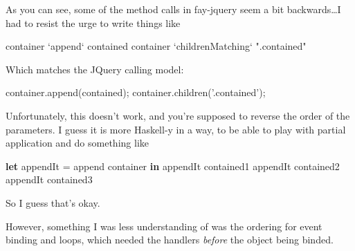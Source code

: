 \documentclass[]{article}
\newenvironment{Shaded}{}{}
\newcommand{\KeywordTok}[1]{\textcolor[rgb]{0.00,0.44,0.13}{\textbf{{#1}}}}
\newcommand{\StringTok}[1]{\textcolor[rgb]{0.25,0.44,0.63}{{#1}}}
\newcommand{\OtherTok}[1]{\textcolor[rgb]{0.00,0.44,0.13}{{#1}}}
\newcommand{\FunctionTok}[1]{\textcolor[rgb]{0.02,0.16,0.49}{{#1}}}
\newcommand{\VariableTok}[1]{\textcolor[rgb]{0.10,0.09,0.49}{{#1}}}
\newcommand{\OperatorTok}[1]{\textcolor[rgb]{0.40,0.40,0.40}{{#1}}}
\newcommand{\AttributeTok}[1]{\textcolor[rgb]{0.49,0.56,0.16}{{#1}}}
\newcommand{\NormalTok}[1]{{#1}}
\begin{document}
As you can see, some of the method calls in fay-jquery seem a bit
backwards\ldots{}I had to resist the urge to write things like

\begin{Shaded}
\begin{Highlighting}[]
\NormalTok{container }\OtherTok{`append`} \NormalTok{contained}
\NormalTok{container }\OtherTok{`childrenMatching`} \StringTok{".contained"}
\end{Highlighting}
\end{Shaded}

Which matches the JQuery calling model:

\begin{Shaded}
\begin{Highlighting}[]
\VariableTok{container}\NormalTok{.}\AttributeTok{append}\NormalTok{(contained)}\OperatorTok{;}
\VariableTok{container}\NormalTok{.}\AttributeTok{children}\NormalTok{(}\StringTok{'.contained'}\NormalTok{)}\OperatorTok{;}
\end{Highlighting}
\end{Shaded}

Unfortunately, this doesn't work, and you're supposed to reverse the
order of the parameters. I guess it is more Haskell-y in a way, to be
able to play with partial application and do something like

\begin{Shaded}
\begin{Highlighting}[]
\KeywordTok{let}
  \NormalTok{appendIt }\FunctionTok{=} \NormalTok{append container}
\KeywordTok{in}
  \NormalTok{appendIt contained1}
  \NormalTok{appendIt contained2}
  \NormalTok{appendIt contained3}
\end{Highlighting}
\end{Shaded}

So I guess that's okay.

However, something I was less understanding of was the ordering for
event binding and loops, which needed the handlers \emph{before} the
object being binded.

\begin{Shaded}
\end{Shaded}
\end{document}
